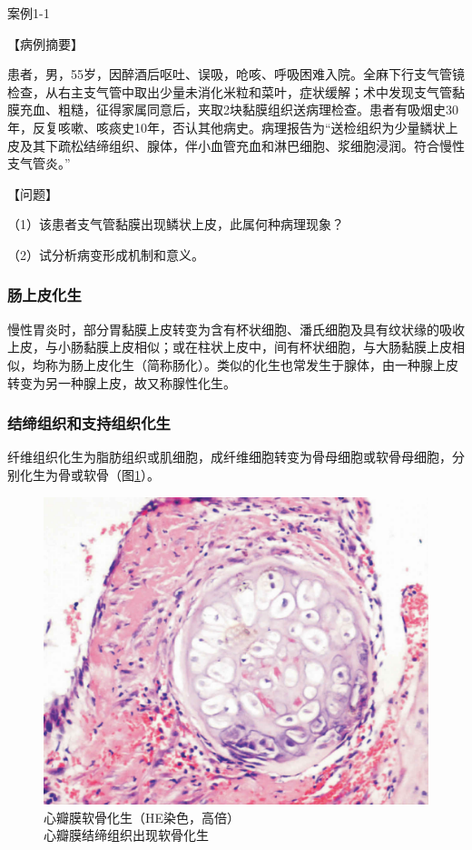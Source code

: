 \begin{framed}
	{案例1-1}

	{【病例摘要】}

	患者，男，55岁，因醉酒后呕吐、误吸，呛咳、呼吸困难入院。全麻下行支气管镜检查，从右主支气管中取出少量未消化米粒和菜叶，症状缓解；术中发现支气管黏膜充血、粗糙，征得家属同意后，夹取2块黏膜组织送病理检查。患者有吸烟史30年，反复咳嗽、咳痰史10年，否认其他病史。病理报告为“送检组织为少量鳞状上皮及其下疏松结缔组织、腺体，伴小血管充血和淋巴细胞、浆细胞浸润。符合慢性支气管炎。”

	{【问题】}

	（1）该患者支气管黏膜出现鳞状上皮，此属何种病理现象？

	（2）试分析病变形成机制和意义。
\end{framed}

\subsubsection{肠上皮化生}

慢性胃炎时，部分胃黏膜上皮转变为含有杯状细胞、潘氏细胞及具有纹状缘的吸收上皮，与小肠黏膜上皮相似；或在柱状上皮中，间有杯状细胞，与大肠黏膜上皮相似，均称为肠上皮化生（简称肠化）。类似的化生也常发生于腺体，由一种腺上皮转变为另一种腺上皮，故又称腺性化生。

\subsubsection{结缔组织和支持组织化生}

纤维组织化生为脂肪组织或肌细胞，成纤维细胞转变为骨母细胞或软骨母细胞，分别化生为骨或软骨（图\ref{fig1-3}）。
\begin{figure}[!htbp]
	\centering
	\includegraphics{./images/Image00004.jpg}
	\caption{心瓣膜软骨化生（HE染色，高倍） \\ {\small 心瓣膜结缔组织出现软骨化生}}
	\label{fig1-3}
\end{figure}

